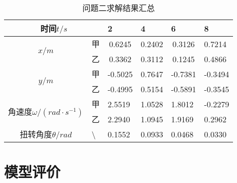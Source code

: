 \documentclass[a4paper,c5size,twoside,UTF8]{ctexart} %
\numberwithin{equation}{section}   %
\begin{document}
\begin{table}[H]
    \centering
    \caption{问题二求解结果汇总}
    \begin{tabular}{|cc|l|l|l|l|}
		\hline
		\multicolumn{2}{|c|}{时间$t/s$}                                                                                      & 2                           & 4                           & 6                           & 8       \\ \hline
		\multicolumn{1}{|c|}{\multirow{2}{*}{$x/m$}}                               & 甲                                     & \multicolumn{1}{c|}{0.6245} & \multicolumn{1}{c|}{0.2402} & \multicolumn{1}{c|}{0.3126} & 0.7214  \\ \cline{2-6} 
		\multicolumn{1}{|c|}{}                                                     & 乙                                     & \multicolumn{1}{c|}{0.3362} & \multicolumn{1}{c|}{0.3112} & \multicolumn{1}{c|}{0.1245} & 0.4866  \\ \hline
		\multicolumn{1}{|c|}{\multirow{2}{*}{$y/m$}}                               & 甲                                     & -0.5025                     & 0.7647                      & -0.7381                     & -0.3494 \\ \cline{2-6} 
		\multicolumn{1}{|c|}{}                                                     & 乙                                     & -0.4995                     & 0.5154                      & -0.5891                     & -0.3545 \\ \hline
		\multicolumn{1}{|c|}{\multirow{2}{*}{角速度$\omega/(rad \cdot s^{-1})$}} & 甲                                     & 2.5519                      & 1.0528                      & 1.8012                      & -0.2279 \\ \cline{2-6} 
		\multicolumn{1}{|c|}{}                                                     & 乙                                     & 2.2940                      & 1.0945                      & 1.9169                      & 0.2962  \\ \hline
		\multicolumn{1}{|c|}{扭转角度$\theta/rad$}                                     & \multicolumn{1}{l|}{\textbackslash{}} & 0.1552                      & 0.0933                      & 0.0468                      & 0.0330  \\ \hline
	\end{tabular}
\end{table}




\newpage

\section{模型评价}
\end{document}
